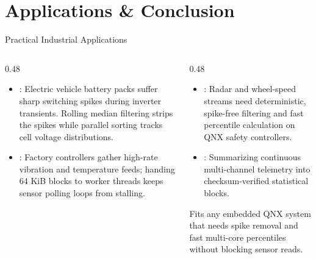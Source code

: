 \section{Applications \& Conclusion}

\begin{frame}{Practical Industrial Applications}
  \begin{columns}[t, onlytextwidth]
    \begin{column}{0.48\textwidth}
      \smalltext\compactitem
      \begin{itemize}
        \item {}: Electric vehicle battery packs suffer sharp switching spikes during inverter transients. Rolling median filtering strips the spikes while parallel sorting tracks cell voltage distributions.
        \item {}: Factory controllers gather high-rate vibration and temperature feeds; handing 64 KiB blocks to worker threads keeps sensor polling loops from stalling.
      \end{itemize}
    \end{column}
    \begin{column}{0.48\textwidth}
      \smalltext\compactitem
      \begin{itemize}
        \item {}: Radar and wheel-speed streams need deterministic, spike-free filtering and fast percentile calculation on QNX safety controllers.
        \item {}: Summarizing continuous multi-channel telemetry into checksum-verified statistical blocks.
      \end{itemize}
      \vskip1.5mm
      \begin{highlight}
        Fits any embedded QNX system that needs spike removal and fast multi-core percentiles without blocking sensor reads.
      \end{highlight}
    \end{column}
  \end{columns}
\end{frame}

